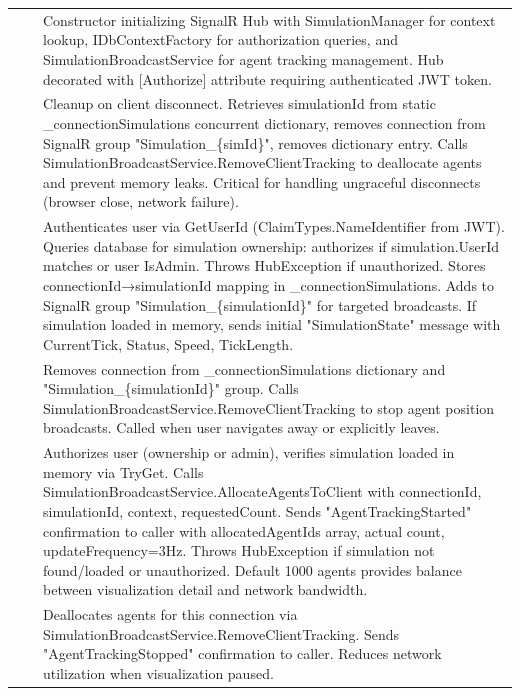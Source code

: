 \begin{longtable}{|L{4cm}|L{4cm}|L{6cm}|}
 & 
 & 
Constructor initializing SignalR Hub with SimulationManager for context lookup, IDbContextFactory for authorization queries, and SimulationBroadcastService for agent tracking management. Hub decorated with [Authorize] attribute requiring authenticated JWT token. \\
&  & 
Cleanup on client disconnect. Retrieves simulationId from static \_connectionSimulations concurrent dictionary, removes connection from SignalR group "Simulation\_\{simId\}", removes dictionary entry. Calls SimulationBroadcastService.RemoveClientTracking to deallocate agents and prevent memory leaks. Critical for handling ungraceful disconnects (browser close, network failure). \\
&  & 
Authenticates user via GetUserId (ClaimTypes.NameIdentifier from JWT). Queries database for simulation ownership: authorizes if simulation.UserId matches or user IsAdmin. Throws HubException if unauthorized. Stores connectionId→simulationId mapping in \_connectionSimulations. Adds to SignalR group "Simulation\_\{simulationId\}" for targeted broadcasts. If simulation loaded in memory, sends initial "SimulationState" message with CurrentTick, Status, Speed, TickLength. \\
&  & 
Removes connection from \_connectionSimulations dictionary and "Simulation\_\{simulationId\}" group. Calls SimulationBroadcastService.RemoveClientTracking to stop agent position broadcasts. Called when user navigates away or explicitly leaves. \\
&  & 
Authorizes user (ownership or admin), verifies simulation loaded in memory via TryGet. Calls SimulationBroadcastService.AllocateAgentsToClient with connectionId, simulationId, context, requestedCount. Sends "AgentTrackingStarted" confirmation to caller with allocatedAgentIds array, actual count, updateFrequency=3Hz. Throws HubException if simulation not found/loaded or unauthorized. Default 1000 agents provides balance between visualization detail and network bandwidth. \\
&  & 
Deallocates agents for this connection via SimulationBroadcastService.RemoveClientTracking. Sends "AgentTrackingStopped" confirmation to caller. Reduces network utilization when visualization paused. \\

\end{longtable}
